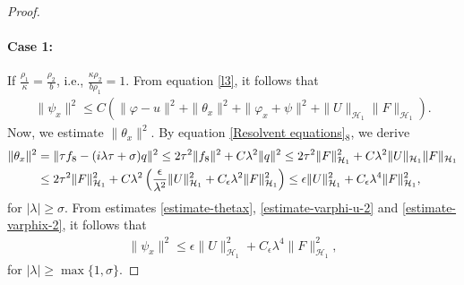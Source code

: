 \documentclass[11pt,reqno]{article}
\begin{document}
\begin{proof}
  	\paragraph{Case 1:}If $\frac{\rho_1}{\kappa}=\frac{\rho_2}{b}$, i.e., $\frac{\kappa \rho_2}{b \rho_1} = 1$.
  	From equation \eqref{l3}, it follows that
  	\begin{align*}
  		\|\psi_x\|^2 \leq C \left(\|\varphi-u\|^2 + \|\theta_x\|^2 + \|\varphi_x+\psi\|^2 + \|U\|_{\mathcal{H}_1} \|F\|_{\mathcal{H}_1}  \right).
  	\end{align*}
  	Now, we estimate $\|\theta_x\|^2$. By equation \eqref{Resolvent equations}$_8$, we derive
  	\begin{align}\label{estimate-thetax}
  		\|\theta_x\|^2 &= \|\tau f_8 - (i \lambda \tau + \sigma) q\|^2 \leq 2 \tau^2 \|f_8\|^2 + C \lambda ^2 \|q\|^2 \leq 2 \tau^2 \|F\|_{\mathcal{H}_1}^2 + C \lambda^2 \|U\|_{\mathcal{H}_1} \|F\|_{\mathcal{H}_1} \notag\\
  		&\leq 2 \tau^2 \|F\|_{\mathcal{H}_1}^2 + C \lambda ^2 \left( \frac{\epsilon}{\lambda ^2} \|U\|_{\mathcal{H}_1}^2 + C_{\epsilon} \lambda^2 \|F\|_{\mathcal{H}_1}^2 \right) \leq \epsilon \|U\|_{\mathcal{H}_1}^2 + C_{\epsilon} \lambda^4 \|F\|_{\mathcal{H}_1}^2,
  	\end{align}
  	for $|\lambda| \geq \sigma$.
  	From estimates \eqref{estimate-thetax}, \eqref{estimate-varphi-u-2} and \eqref{estimate-varphix-2}, it follows that
  	\begin{align}
  		\|\psi_x\|^2 \leq \epsilon \|U\|_{\mathcal{H}_1}^2 + C_{\epsilon} \lambda^4 \|F\|_{\mathcal{H}_1}^2,
  	\end{align}
  	for $|\lambda| \geq \max\{1, \sigma\}$.

\end{proof}
\end{document}
